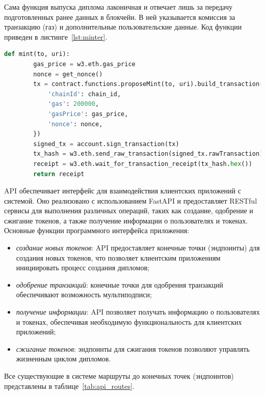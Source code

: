 Сама функция выпуска диплома лаконичная и отвечает лишь за передачу подготовленных ранее данных в блокчейн. В ней указывается комиссия за транзакцию (газ) и дополнительные пользовательские данные. Код функции приведен в листинге~\ref{lst:minter}.

\begin{lstlisting}[label=lst:minter, language=Python, caption=Функция выпуска диплома]
    def mint(to, uri):
        gas_price = w3.eth.gas_price
        nonce = get_nonce()
        tx = contract.functions.proposeMint(to, uri).build_transaction({
            'chainId': chain_id,
            'gas': 200000,
            'gasPrice': gas_price,
            'nonce': nonce,
        })
        signed_tx = account.sign_transaction(tx)
        tx_hash = w3.eth.send_raw_transaction(signed_tx.rawTransaction)
        receipt = w3.eth.wait_for_transaction_receipt(tx_hash.hex())
        return receipt
\end{lstlisting}

API обеспечивает интерфейс для взаимодействия клиентских приложений с системой. Оно реализовано с использованием FastAPI и предоставляет RESTful сервисы для выполнения различных операций, таких как создание, одобрение и сжигание токенов, а также получение информации о пользователях и токенах. Основные функции программного интерфейса приложения:

\begin{itemize}
    \item \textit{создание новых токенов}: API предоставляет конечные точки (эндпоинты) для создания новых токенов, что позволяет клиентским приложениям инициировать процесс создания дипломов;
    \item \textit{одобрение транзакций}: конечные точки для одобрения транзакций обеспечивают возможность мультиподписи;
    \item \textit{получение информации}: API позволяет получать информацию о пользователях и токенах, обеспечивая необходимую функциональность для клиентских приложений;
    \item \textit{сжигание токенов}: эндпоинты для сжигания токенов позволяют управлять жизненным циклом дипломов.
\end{itemize}

Все существующие в системе маршруты до конечных точек (эндпоинтов) представлены в таблице~\ref{tab:api_routes}.

